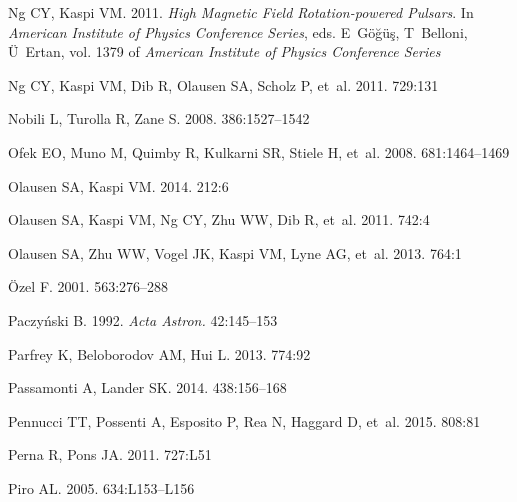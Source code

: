 \documentclass[letterpaper]{ar-1col}
\begin{document}
\begin{thebibliography}{}
{Ng} CY, {Kaspi} VM. 2011.
\textit{{High Magnetic Field Rotation-powered Pulsars}}. In \textit{American
  Institute of Physics Conference Series}, eds. E~{G{\"o}{\u g}{\"u}{\c s}},
  T~{Belloni}, {\"U}~{Ertan}, vol. 1379 of \textit{American Institute of
  Physics Conference Series}

{Ng} CY, {Kaspi} VM, {Dib} R, {Olausen} SA, {Scholz} P, et~al. 2011.
\textit{\apj} 729:131

{Nobili} L, {Turolla} R, {Zane} S. 2008.
\textit{\mnras} 386:1527--1542

{Ofek} EO, {Muno} M, {Quimby} R, {Kulkarni} SR, {Stiele} H, et~al. 2008.
\textit{\apj} 681:1464--1469

{Olausen} SA, {Kaspi} VM. 2014.
\textit{\apjs} 212:6

{Olausen} SA, {Kaspi} VM, {Ng} CY, {Zhu} WW, {Dib} R, et~al. 2011.
\textit{\apj} 742:4

{Olausen} SA, {Zhu} WW, {Vogel} JK, {Kaspi} VM, {Lyne} AG, et~al. 2013.
\textit{\apj} 764:1

\"Ozel F. 2001.
\textit{\apj} 563:276--288

Paczy\'{n}ski B. 1992.
\textit{Acta Astron.} 42:145--153

{Parfrey} K, {Beloborodov} AM, {Hui} L. 2013.
\textit{\apj} 774:92

{Passamonti} A, {Lander} SK. 2014.
\textit{\mnras} 438:156--168

{Pennucci} TT, {Possenti} A, {Esposito} P, {Rea} N, {Haggard} D, et~al. 2015.
\textit{\apj} 808:81

{Perna} R, {Pons} JA. 2011.
\textit{\apjl} 727:L51

{Piro} AL. 2005.
\textit{\apjl} 634:L153--L156


\end{thebibliography}
\end{document}
